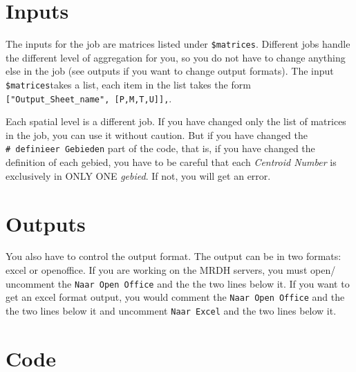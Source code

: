 \documentclass[
  letterpaper,
  DIV=11,
  numbers=noendperiod]{scrreprt}
\begin{document}
\begin{verbatim}
\end{verbatim}

\section{Inputs}

The inputs for the job are matrices listed under \texttt{\$matrices}.
Different jobs handle the different level of aggregation for you, so you
do not have to change anything else in the job (see outputs if you want
to change output formats). The input \texttt{\$matrices}takes a list,
each item in the list takes the form
\texttt{{[}"Output\_Sheet\_name",\ {[}P,M,T,U{]}{]},}.

\begin{tcolorbox}[enhanced jigsaw, opacitybacktitle=0.6, rightrule=.15mm, left=2mm, title=\textcolor{quarto-callout-important-color}{\faExclamation}\hspace{0.5em}{Important}, bottomrule=.15mm, toptitle=1mm, titlerule=0mm, arc=.35mm, colbacktitle=quarto-callout-important-color!10!white, colframe=quarto-callout-important-color-frame, opacityback=0, bottomtitle=1mm, breakable, toprule=.15mm, leftrule=.75mm, coltitle=black, colback=white]

Each spatial level is a different job. If you have changed only the list
of matrices in the job, you can use it without caution. But if you have
changed the \texttt{\#\ definieer\ Gebieden} part of the code, that is,
if you have changed the definition of each gebied, you have to be
careful that each \emph{Centroid Number} is exclusively in ONLY ONE
\emph{gebied}. If not, you will get an error.

\end{tcolorbox}

\section{Outputs}

You also have to control the output format. The output can be in two
formats: excel or openoffice. If you are working on the MRDH servers,
you must open/ uncomment the \texttt{Naar\ Open\ Office} and the the two
lines below it. If you want to get an excel format output, you would
comment the \texttt{Naar\ Open\ Office} and the the two lines below it
and uncomment \texttt{Naar\ Excel} and the two lines below it.

\section{Code}
\end{document}
